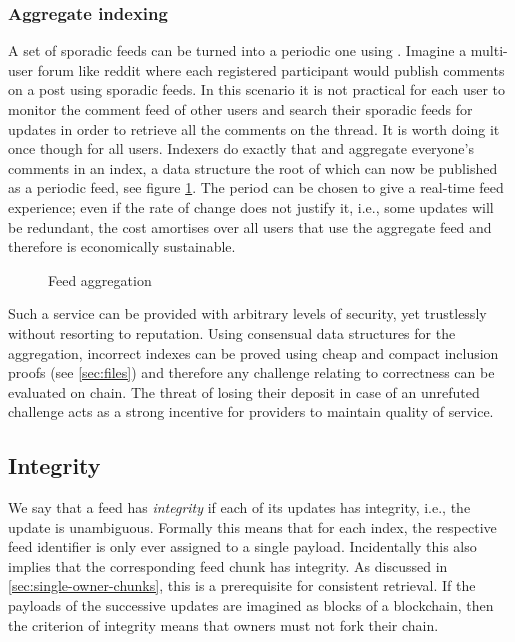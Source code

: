 \subsubsection{Aggregate indexing}

A set of sporadic feeds can be turned into a periodic one using . Imagine a multi-user forum like reddit where each registered participant would publish comments on a post using sporadic feeds. In this scenario it is not practical for each user to monitor the comment feed of other users and search their sporadic feeds for updates in order to retrieve all the comments on the thread. It is worth doing it once though for all users. Indexers do exactly that and aggregate everyone's comments in an index, a data structure the root of which can now be published as a periodic feed, see figure \ref{fig:feed-aggregation}. The period can be chosen to give a real-time feed experience; even if the rate of change does not justify it, i.e., some updates will be redundant, the cost amortises over all users that use the aggregate feed and therefore is economically sustainable. 

\begin{figure}[htbp]
\centering
\caption[Feed aggregation \statusred]{Feed aggregation}
\label{fig:feed-aggregation}
\end{figure}

Such a service can be provided with arbitrary levels of security, yet trustlessly without resorting to reputation. Using consensual data structures for the aggregation, incorrect indexes can be proved using cheap and compact inclusion proofs (see \ref{sec:files}) and therefore any challenge relating to correctness can be evaluated on chain. The threat of losing their deposit in case of an unrefuted challenge acts as a strong incentive for providers to maintain quality of service.


\subsection{Integrity \statusyellow}\label{sec:feed-integrity}

We say that a feed has \emph{integrity} if each of its updates has integrity, i.e., the update is unambiguous. Formally this means that for each index, the respective feed identifier is only ever assigned to a single payload. Incidentally this also implies that the corresponding feed chunk has integrity. As discussed in \ref{sec:single-owner-chunks}, this is a prerequisite for consistent retrieval. 
If the payloads of the successive updates are imagined as blocks of a blockchain, then the criterion of integrity means that owners must not fork their chain. 

